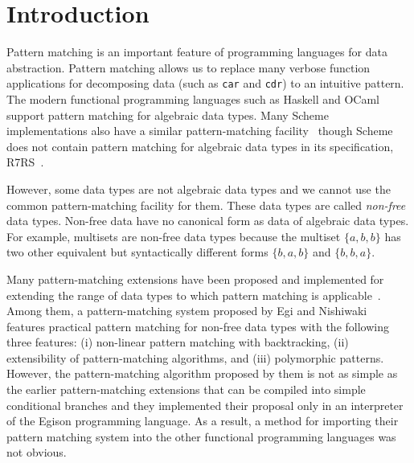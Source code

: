 \documentclass[acmlarge]{acmart}
\begin{document}

\maketitle

\section{Introduction}\label{intro}

Pattern matching is an important feature of programming languages for data abstraction.
Pattern matching allows us to replace many verbose function applications for decomposing data (such as \texttt{car} and \texttt{cdr}) to an intuitive pattern.
The modern functional programming languages such as Haskell and OCaml support pattern matching for algebraic data types.
Many Scheme implementations also have a similar pattern-matching facility~\cite{gauchePM} though Scheme does not contain pattern matching for algebraic data types in its specification, R7RS~\cite{shinn2013revised}.

However, some data types are not algebraic data types and we cannot use the common pattern-matching facility for them.
These data types are called \emph{non-free} data types.
Non-free data have no canonical form as data of algebraic data types.
For example, multisets are non-free data types because the multiset $\{a,b,b\}$ has two other equivalent but syntactically different forms $\{b,a,b\}$ and $\{b,b,a\}$.

Many pattern-matching extensions have been proposed and implemented for extending the range of data types to which pattern matching is applicable~\cite{Hudak07ahistory,turner2012some}.
Among them, a pattern-matching system proposed by Egi and Nishiwaki~\cite{egi2018aplas} features practical pattern matching for non-free data types with the following three features: (i) non-linear pattern matching with backtracking, (ii) extensibility of pattern-matching algorithms, and (iii) polymorphic patterns.
However, the pattern-matching algorithm proposed by them is not as simple as the earlier pattern-matching extensions that can be compiled into simple conditional branches and they implemented their proposal only in an interpreter of the Egison programming language.
As a result, a method for importing their pattern matching system into the other functional programming languages was not obvious.
\end{document}
